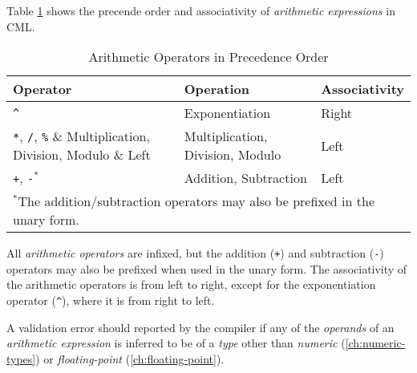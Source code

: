 Table \ref{tab:arithmetic-constraints} shows the precende order and associativity of \emph{arithmetic expressions}
in CML.

\begin{table}[H]
\centering
\begin{tabular}
{ l l l }
\hline
Operator & Operation & Associativity \\
\hline
\verb!^! & Exponentiation & Right \\
\verb!*!, \verb!/!, \verb!%! & Multiplication, Division, Modulo & Left  \\
\verb!+!, \verb!-!$^*$ & Addition, Subtraction & Left \\
\multicolumn{3}{l}{\footnotesize{$^*$The addition/subtraction operators
may also be prefixed in the unary form.}}
\end{tabular}
\caption{Arithmetic Operators in Precedence Order}
\label{tab:arithmetic-constraints}
\end{table}

All \emph{arithmetic operators} are infixed,
but the addition (\verb|+|) and subtraction (\verb|-|) operators may also be prefixed when used in the unary form.
The associativity of the arithmetic operators is from left to right,
except for the exponentiation operator (\verb|^|),
where it is from right to left.

A validation error should reported by the compiler if any of the \emph{operands}
of an \emph{arithmetic expression} is inferred to be of a \emph{type}
other than \emph{numeric} (\ref{ch:numeric-types})
or \emph{floating-point} (\ref{ch:floating-point}).
